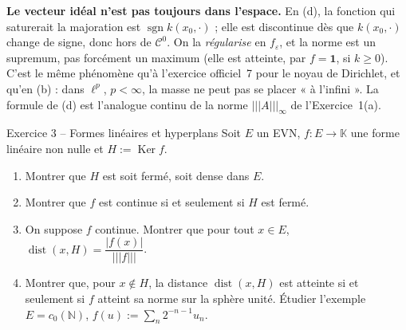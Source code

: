 \documentclass[11pt,a4paper]{article}
\newcommand{\N}{\mathbb{N}}
\newcommand{\K}{\mathbb{K}}
\newcommand{\dist}{\operatorname{dist}}
\newcommand{\opnorm}[1]{|\!|\!|#1|\!|\!|}
\newcommand{\Cz}{\mathcal{C}^0}
\DeclareMathOperator{\Ker}{Ker}
\DeclareMathOperator{\sgn}{sgn}
\theoremstyle{definition}
\begin{document}
\begin{piege}
\textbf{Le vecteur idéal n'est pas toujours dans l'espace.} En (d), la fonction qui saturerait la majoration est $\sgn k(x_0,\cdot)$ ; elle est discontinue dès que $k(x_0,\cdot)$ change de signe, donc hors de $\Cz$. On la \emph{régularise} en $f_\varepsilon$, et la norme est un supremum, pas forcément un maximum (elle est atteinte, par $f=\mathbf 1$, si $k\ge0$). C'est le même phénomène qu'à l'exercice officiel~7 pour le noyau de Dirichlet, et qu'en (b) : dans $\ell^p$, $p<\infty$, la masse ne peut pas se placer « à l'infini ». La formule de (d) est l'analogue continu de la norme $\opnorm A_\infty$ de l'Exercice~1(a).
\end{piege}

\begin{exo}{Exercice 3 -- Formes linéaires et hyperplans}
Soit $E$ un EVN, $f:E\to\K$ une forme linéaire non nulle et $H:=\Ker f$.
\begin{enumerate}[label=(\alph*)]
  \item Montrer que $H$ est soit fermé, soit dense dans $E$.
  \item Montrer que $f$ est continue si et seulement si $H$ est fermé.
  \item On suppose $f$ continue. Montrer que pour tout $x\in E$, $\dist(x,H)=\dfrac{|f(x)|}{\opnorm f}$.
  \item Montrer que, pour $x\notin H$, la distance $\dist(x,H)$ est atteinte si et seulement si $f$ atteint sa norme sur la sphère unité. Étudier l'exemple $E=c_0(\N)$, $f(u):=\sum_n2^{-n-1}u_n$.
\end{enumerate}
\end{exo}
\end{document}
